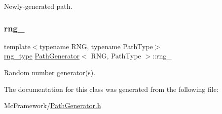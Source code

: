 Newly-\/generated path. 

\hypertarget{class_path_generator_a9a6ba7393db535890497b21b46bdfe67}{}\label{class_path_generator_a9a6ba7393db535890497b21b46bdfe67} 
\subsubsection{\texorpdfstring{rng\+\_\+}{rng\_}}
{\footnotesize\ttfamily template$<$typename R\+NG, typename Path\+Type$>$ \\
\hyperlink{class_path_generator_a7e71cbb5376b07b319b1f042a1035335}{rng\+\_\+type} \hyperlink{class_path_generator}{Path\+Generator}$<$ R\+NG, Path\+Type $>$\+::rng\+\_\+\hspace{0.3cm}{\ttfamily [private]}}



Random number generator(s). 



The documentation for this class was generated from the following file\+:\begin{DoxyCompactItemize}
\item 
Mc\+Framework/\hyperlink{_path_generator_8h}{Path\+Generator.\+h}\end{DoxyCompactItemize}
